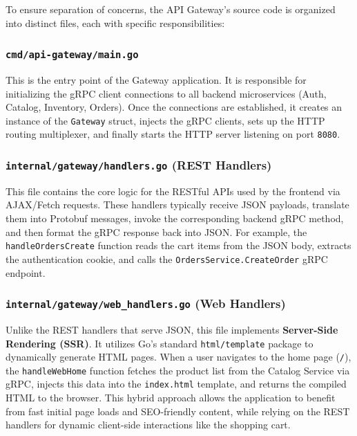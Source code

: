 \documentclass[12pt,a4paper]{article}
\begin{document}
To ensure separation of concerns, the API Gateway's source code is organized into distinct files, each with specific responsibilities:

\subsubsection{\texttt{cmd/api-gateway/main.go}}
This is the entry point of the Gateway application. It is responsible for initializing the gRPC client connections to all backend microservices (Auth, Catalog, Inventory, Orders). Once the connections are established, it creates an instance of the \texttt{Gateway} struct, injects the gRPC clients, sets up the HTTP routing multiplexer, and finally starts the HTTP server listening on port \texttt{8080}.

\subsubsection{\texttt{internal/gateway/handlers.go} (REST Handlers)}
This file contains the core logic for the RESTful APIs used by the frontend via AJAX/Fetch requests. These handlers typically receive JSON payloads, translate them into Protobuf messages, invoke the corresponding backend gRPC method, and then format the gRPC response back into JSON. 
For example, the \texttt{handleOrdersCreate} function reads the cart items from the JSON body, extracts the authentication cookie, and calls the \texttt{OrdersService.CreateOrder} gRPC endpoint.

\subsubsection{\texttt{internal/gateway/web\_handlers.go} (Web Handlers)}
Unlike the REST handlers that serve JSON, this file implements \textbf{Server-Side Rendering (SSR)}. It utilizes Go's standard \texttt{html/template} package to dynamically generate HTML pages. 
When a user navigates to the home page (\texttt{/}), the \texttt{handleWebHome} function fetches the product list from the Catalog Service via gRPC, injects this data into the \texttt{index.html} template, and returns the compiled HTML to the browser. This hybrid approach allows the application to benefit from fast initial page loads and SEO-friendly content, while relying on the REST handlers for dynamic client-side interactions like the shopping cart.
\end{document}
